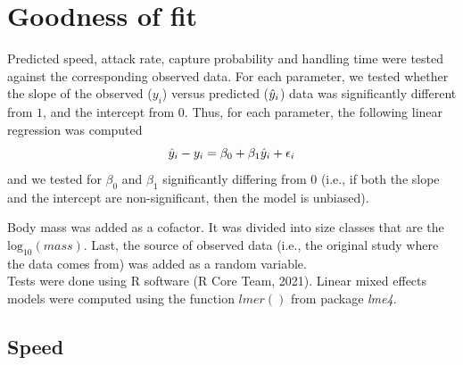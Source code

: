 \documentclass[utf8, 12 pt]{frontiers_suppmat}
\begin{document}
%

\hypertarget{goodness-of-fit}{%
\section{Goodness of fit}\label{goodness-of-fit}}

Predicted speed, attack rate, capture probability and handling time were tested against the corresponding observed data. 
For each parameter, we tested whether the slope of the observed ($y_i$) versus predicted ($\Hat{y}_i$) data was significantly different from $1$, and the intercept from $0$. Thus, for each parameter, the following linear regression was computed 
\begin{equation}
 \Hat{y}_i  - y_i = \beta _0 + \beta _1 \Hat{y}_i + \epsilon _i
\end{equation}
and we tested for $\beta _0$ and $\beta _1$ significantly differing from $0$ (i.e., if both the slope and the intercept are non-significant, then the model is unbiased). 
\par
Body mass was added as a cofactor. It was divided into size classes that are the $\mathrm{log}_{10}(mass)$. Last, the source of observed data (i.e., the original study where the data comes from) was added as a random variable. \\
 Tests were done using R software (R Core Team, 2021). Linear mixed effects models were computed using the function $lmer()$ from package \textit{lme4}. 
\par
\vspace{0.3 cm}
\hypertarget{speed}{%
\subsection{Speed}\label{speed}}
\end{document}

